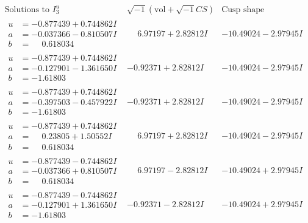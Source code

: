 \documentclass[1p]{elsarticle_modified}
\theoremstyle{definition}
\newcommand{\I}{\sqrt{-1}}
\begin{document}
$$\begin{array}{c|c|c}  
\text{Solutions to }I^u_{3}& \I (\text{vol} + \sqrt{-1}CS) & \text{Cusp shape}\\
 \hline 
\begin{aligned}
u &= -0.877439 + 0.744862 I \\
a &= -0.037366 - 0.810507 I \\
b &= \phantom{-}0.618034\phantom{ +0.000000I}\end{aligned}
 & \phantom{-}6.97197 + 2.82812 I & -10.49024 - 2.97945 I \\ \hline\begin{aligned}
u &= -0.877439 + 0.744862 I \\
a &= -0.127901 - 1.361650 I \\
b &= -1.61803\phantom{ +0.000000I}\end{aligned}
 & -0.92371 + 2.82812 I & -10.49024 - 2.97945 I \\ \hline\begin{aligned}
u &= -0.877439 + 0.744862 I \\
a &= -0.397503 - 0.457922 I \\
b &= -1.61803\phantom{ +0.000000I}\end{aligned}
 & -0.92371 + 2.82812 I & -10.49024 - 2.97945 I \\ \hline\begin{aligned}
u &= -0.877439 + 0.744862 I \\
a &= \phantom{-}0.23805 + 1.50552 I \\
b &= \phantom{-}0.618034\phantom{ +0.000000I}\end{aligned}
 & \phantom{-}6.97197 + 2.82812 I & -10.49024 - 2.97945 I \\ \hline\begin{aligned}
u &= -0.877439 - 0.744862 I \\
a &= -0.037366 + 0.810507 I \\
b &= \phantom{-}0.618034\phantom{ +0.000000I}\end{aligned}
 & \phantom{-}6.97197 - 2.82812 I & -10.49024 + 2.97945 I \\ \hline\begin{aligned}
u &= -0.877439 - 0.744862 I \\
a &= -0.127901 + 1.361650 I \\
b &= -1.61803\phantom{ +0.000000I}\end{aligned}
 & -0.92371 - 2.82812 I & -10.49024 + 2.97945 I \\ \hline\begin{aligned}

\end{aligned}
\end{array}$$
\end{document}
